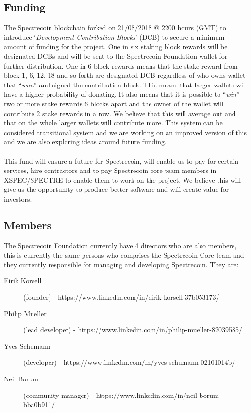\subsection{Funding}
The Spectrecoin blockchain forked on 21/08/2018 @ 2200 hours (GMT) to
introduce ‘\textit{Development Contribution Blocks}’ (DCB) to secure a
minimum amount of funding for the project. One in six staking block rewards
will be designated DCBs and will be sent to the Spectrecoin Foundation
wallet for further distribution. One in 6 block rewards means that the
stake reward from block 1, 6, 12, 18 and so forth are designated DCB
regardless of who owns wallet that “\textit{won}” and signed the
contribution block. This means that larger wallets will have a higher
probability of donating. It also means that it is possible to
“\textit{win}” two or more stake rewards 6 blocks apart and the owner
of the wallet will contribute 2 stake rewards in a row. We believe that
this will average out and that on the whole larger wallets will contribute
more. This system can be considered transitional system and we are working
on an improved version of this and we are also exploring ideas around
future funding.
\\
\\
\noindent
This fund will ensure a future for Spectrecoin, will enable us to pay for
certain services, hire contractors and to pay Spectrecoin core team members
in XSPEC/SPECTRE to enable them to work on the project. We believe this
will give us the opportunity to produce better software and will create
value for investors.



\subsection{Members}
The Spectrecoin Foundation currently have 4 directors who are also members,
this is currently the same persons who comprises the Spectrecoin Core team
and they currently responsible for managing and developing Spectrecoin.
They are:



\begin{description}
	\item[Eirik Korsell]  (founder) - https://www.linkedin.com/in/eirik-korsell-37b053173/
	\item[Philip Mueller] (lead developer) - https://www.linkedin.com/in/philip-mueller-82039585/
	\item[Yves Schumann] (developer) - https://www.linkedin.com/in/yves-schumann-02101014b/
	\item[Neil Borum] (community manager) - https://www.linkedin.com/in/neil-borum-bba0b911/
\end{description}



